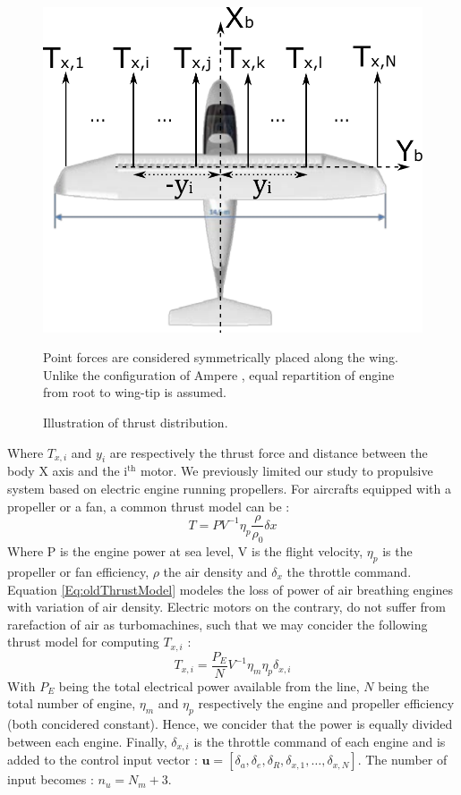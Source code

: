 \begin{figure}[hbt!]
	\centering
	\includegraphics[width=.6\textwidth]{AmpereTop}
	\caption{Illustration of thrust distribution.} Point forces are considered symmetrically placed along the wing. Unlike the configuration of Ampere \cite{Ampere_concept}, equal repartition of engine from root to wing-tip is assumed. \label{fig:AmpereTop}
\end{figure}

Where $T_{x,i}$ and $y_i$ are respectively the thrust force and distance between the body X axis and the i$^{\text{th}}$ motor. 
We previously limited our study to propulsive system based on electric engine running propellers. For aircrafts equipped with a propeller or a fan, a common thrust model can be \cite{SachsElectricPerf}:
\begin{equation}
	T=PV^{-1} \eta_p \frac{\rho}{\rho_0} \delta x \label{Eq:oldThrustModel}
\end{equation}
Where P is the engine power at sea level, V is the flight velocity, $\eta_p$ is the propeller or fan efficiency, $\rho$ the air density and $\delta_x$ the throttle command. Equation \ref{Eq:oldThrustModel} modeles the loss of power of air breathing engines with variation of air density. Electric motors on the contrary, do not suffer from rarefaction of air as turbomachines, such that we may concider the following thrust model for computing $T_{x,i}$ \cite{SachsElectricPerf}:
\begin{equation}
	T_{x,i}=\frac{P_E}{N}V^{-1}\eta_m\eta_p \delta_{x,i}
\end{equation}
With $P_E$ being the total electrical power available from the line, $N$ being the total number of engine, $\eta_m$ and $\eta_p$ respectively the engine and propeller efficiency (both concidered constant). Hence, we concider that the power is equally divided between each engine. Finally, $\delta_{x,i}$ is the throttle command of each engine and is added to the control input vector : $\textbf{u}=[\delta_a , \delta_e , \delta_R , \delta_{x,1} , \dots , \delta_{x,N}]$. The number of input becomes : $n_u=N_m+3$.

